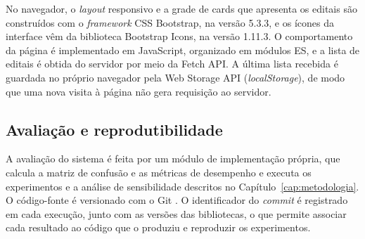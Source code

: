 No navegador, o \textit{layout} responsivo e a grade de cards que apresenta os
editais são construídos com o \textit{framework} CSS Bootstrap, na versão 5.3.3,
e os ícones da interface vêm da biblioteca Bootstrap Icons, na versão 1.11.3. O
comportamento da página é implementado em JavaScript, organizado em módulos ES,
e a lista de editais é obtida do servidor por meio da Fetch API. A última lista
recebida é guardada no próprio navegador pela Web Storage API
(\textit{localStorage}), de modo que uma nova visita à página não gera
requisição ao servidor.

\subsection{Avaliação e reprodutibilidade}

A avaliação do sistema é feita por um módulo de implementação própria, que
calcula a matriz de confusão e as métricas de desempenho e executa os
experimentos e a análise de sensibilidade descritos no
Capítulo~\ref{cap:metodologia}. O código-fonte é versionado com o Git
\cite{git}. O identificador do \textit{commit} é registrado em cada execução,
junto com as versões das bibliotecas, o que permite associar cada resultado ao
código que o produziu e reproduzir os experimentos.